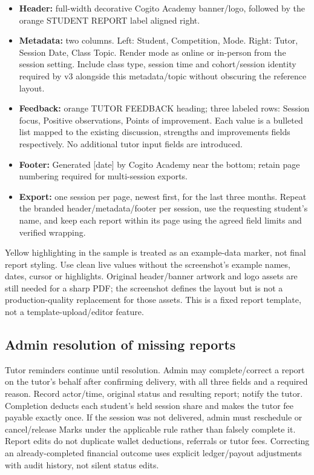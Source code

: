 \documentclass[11pt,a4paper]{article}
\begin{document}
\begin{itemize}
\item \textbf{Header:} full-width decorative Cogito Academy banner/\allowbreak{}logo, followed by the orange STUDENT REPORT label aligned right.
\item \textbf{Metadata:} two columns. Left: Student, Competition, Mode. Right: Tutor, Session Date, Class Topic. Render mode as online or in-person from the session setting. Include class type, session time and cohort/\allowbreak{}session identity required by v3 alongside this metadata/\allowbreak{}topic without obscuring the reference layout.
\item \textbf{Feedback:} orange TUTOR FEEDBACK heading; three labeled rows: Session focus, Positive observations, Points of improvement. Each value is a bulleted list mapped to the existing discussion, strengths and improvements fields respectively. No additional tutor input fields are introduced.
\item \textbf{Footer:} Generated [date] by Cogito Academy near the bottom; retain page numbering required for multi-session exports.
\item \textbf{Export:} one session per page, newest first, for the last three months. Repeat the branded header/\allowbreak{}metadata/\allowbreak{}footer per session, use the requesting student's name, and keep each report within its page using the agreed field limits and verified wrapping.
\end{itemize}

Yellow highlighting in the sample is treated as an example-data marker, not final report styling. Use clean live values without the screenshot's example names, dates, cursor or highlights. Original header/\allowbreak{}banner artwork and logo assets are still needed for a sharp PDF; the screenshot defines the layout but is not a production-quality replacement for those assets. This is a fixed report template, not a template-upload/\allowbreak{}editor feature.

\subsection*{Admin resolution of missing reports}

Tutor reminders continue until resolution. Admin may complete/\allowbreak{}correct a report on the tutor's behalf after confirming delivery, with all three fields and a required reason. Record actor/\allowbreak{}time, original status and resulting report; notify the tutor. Completion deducts each student's held session share and makes the tutor fee payable exactly once. If the session was not delivered, admin must reschedule or cancel/\allowbreak{}release Marks under the applicable rule rather than falsely complete it. Report edits do not duplicate wallet deductions, referrals or tutor fees. Correcting an already-completed financial outcome uses explicit ledger/\allowbreak{}payout adjustments with audit history, not silent status edits.
\end{document}
